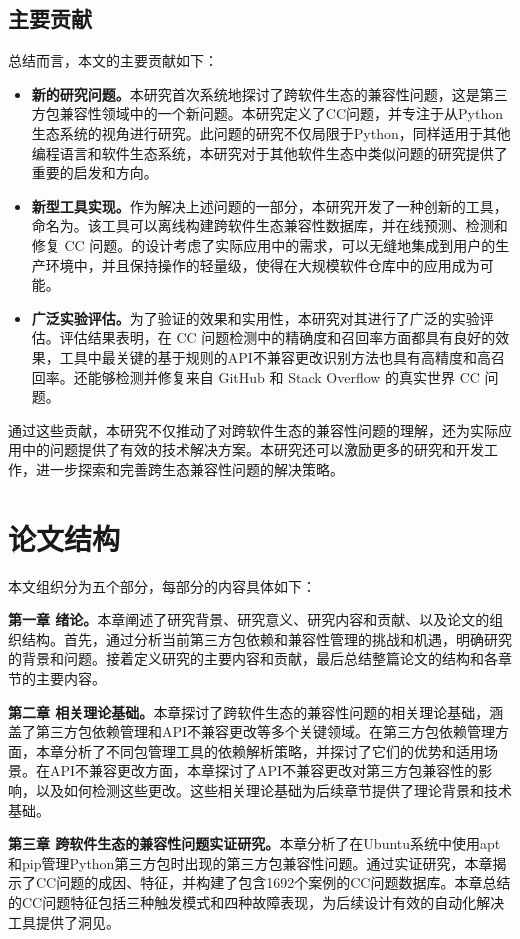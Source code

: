 \subsection{主要贡献}
总结而言，本文的主要贡献如下： 
\begin{itemize}
	\item \textbf{新的研究问题。}本研究首次系统地探讨了跨软件生态的兼容性问题，这是第三方包兼容性领域中的一个新问题。本研究定义了CC问题，并专注于从Python生态系统的视角进行研究。此问题的研究不仅局限于Python，同样适用于其他编程语言和软件生态系统，本研究对于其他软件生态中类似问题的研究提供了重要的启发和方向。
	\item \textbf{新型工具实现。}作为解决上述问题的一部分，本研究开发了一种创新的工具，命名为\tool{}。该工具可以离线构建跨软件生态兼容性数据库，并在线预测、检测和修复 CC 问题。\tool{}的设计考虑了实际应用中的需求，可以无缝地集成到用户的生产环境中，并且保持操作的轻量级，使得在大规模软件仓库中的应用成为可能。
	\item \textbf{广泛实验评估。}为了验证\tool{}的效果和实用性，本研究对其进行了广泛的实验评估。评估结果表明，\tool{}在 CC 问题检测中的精确度和召回率方面都具有良好的效果，工具中最关键的基于规则的API不兼容更改识别方法也具有高精度和高召回率。\tool{}还能够检测并修复来自 GitHub 和 Stack Overflow 的真实世界 CC 问题。
\end{itemize}
通过这些贡献，本研究不仅推动了对跨软件生态的兼容性问题的理解，还为实际应用中的问题提供了有效的技术解决方案。本研究还可以激励更多的研究和开发工作，进一步探索和完善跨生态兼容性问题的解决策略。

\section{论文结构}
本文组织分为五个部分，每部分的内容具体如下：

\textbf{第一章 绪论。}本章阐述了研究背景、研究意义、研究内容和贡献、以及论文的组织结构。首先，通过分析当前第三方包依赖和兼容性管理的挑战和机遇，明确研究的背景和问题。接着定义研究的主要内容和贡献，最后总结整篇论文的结构和各章节的主要内容。

\textbf{第二章 相关理论基础。}本章探讨了跨软件生态的兼容性问题的相关理论基础，涵盖了第三方包依赖管理和API不兼容更改等多个关键领域。在第三方包依赖管理方面，本章分析了不同包管理工具的依赖解析策略，并探讨了它们的优势和适用场景。在API不兼容更改方面，本章探讨了API不兼容更改对第三方包兼容性的影响，以及如何检测这些更改。这些相关理论基础为后续章节提供了理论背景和技术基础。

\textbf{第三章 跨软件生态的兼容性问题实证研究。}本章分析了在Ubuntu系统中使用apt和pip管理Python第三方包时出现的第三方包兼容性问题。通过实证研究，本章揭示了CC问题的成因、特征，并构建了包含1692个案例的CC问题数据库。本章总结的CC问题特征包括三种触发模式和四种故障表现，为后续设计有效的自动化解决工具提供了洞见。

